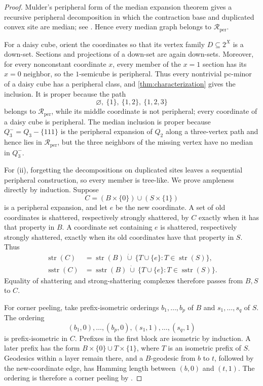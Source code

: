 \documentclass[11pt]{article}
\theoremstyle{definition}
\theoremstyle{remark}
\newcommand{\Rper}{\mathcal R_{\mathrm{per}}}
\newcommand{\strc}{\operatorname{str}}
\newcommand{\sstrc}{\operatorname{sstr}}
\begin{document}
\begin{proof}
Mulder's peripheral form of the median expansion theorem gives a recursive
peripheral decomposition in which the contraction base and duplicated
convex site are median; see
\cite[p.~140]{Gologranc14treehamming}.  Hence every median
graph belongs to \(\Rper\).

For a daisy cube, orient the coordinates so that its vertex family
\(D\subseteq2^X\) is a down-set.  Sections and projections of a down-set are
again down-sets.  Moreover, for every nonconstant coordinate \(x\), every
member of the \(x=1\) section has its \(x=0\) neighbor, so the \(1\)-semicube
is peripheral.  Thus every nontrivial pc-minor of a daisy cube has a
peripheral class, and \cref{thm:characterization} gives the inclusion.
It is proper because the path
\[
 \varnothing,\ \{1\},\ \{1,2\},\ \{1,2,3\}
\]
belongs to \(\Rper\), while its middle coordinate is not peripheral; every
coordinate of a daisy cube is peripheral.  The median inclusion is proper
because \(Q_3^-=Q_3-\{111\}\) is the peripheral expansion of \(Q_2\) along
a three-vertex path and hence lies in \(\Rper\), but the three neighbors of
the missing vertex have no median in \(Q_3^-\).

For (ii), forgetting the decompositions on duplicated sites leaves a
sequential peripheral construction, so every member is tree-like.  We prove
ampleness directly by induction.  Suppose
\[
 C=(B\times\{0\})\cup(S\times\{1\})
\]
is a peripheral expansion, and let \(e\) be the new coordinate.  A set of
old coordinates is shattered, respectively strongly shattered, by \(C\)
exactly when it has that property in \(B\).  A coordinate set containing
\(e\) is shattered, respectively strongly shattered, exactly when its old
coordinates have that property in \(S\).  Thus
\[
\begin{aligned}
 \strc(C)
   &=\strc(B)\ \dot\cup\
       \{T\cup\{e\}:T\in\strc(S)\},\\
 \sstrc(C)
   &=\sstrc(B)\ \dot\cup\
       \{T\cup\{e\}:T\in\sstrc(S)\}.
\end{aligned}
\]
Equality of shattering and strong-shattering complexes therefore passes
from \(B,S\) to \(C\).

For corner peeling, take prefix-isometric orderings
\(b_1,\ldots,b_p\) of \(B\) and \(s_1,\ldots,s_q\) of \(S\).  The ordering
\[
 (b_1,0),\ldots,(b_p,0),(s_1,1),\ldots,(s_q,1)
\]
is prefix-isometric in \(C\).  Prefixes in the first block are isometric by
induction.  A later prefix has the form
\(B\times\{0\}\cup T\times\{1\}\), where \(T\) is an isometric prefix of
\(S\).  Geodesics within a layer remain there, and a \(B\)-geodesic from
\(b\) to \(t\), followed by the new-coordinate edge, has Hamming length
between \((b,0)\) and \((t,1)\).  The ordering is therefore a corner peeling
by \cite[Proposition~4.2]{ChalopiChepoiMoran22}.


\end{proof}
\end{document}
